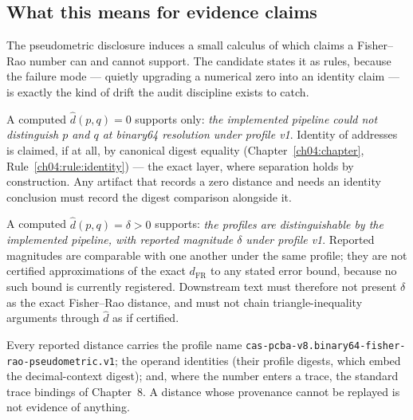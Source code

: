\subsection{What this means for evidence claims}
\label{ch06:sec:evidenceclaims}

The pseudometric disclosure induces a small calculus of which claims a
Fisher--Rao number can and cannot support. The candidate states it as
rules, because the failure mode --- quietly upgrading a numerical zero
into an identity claim --- is exactly the kind of drift the audit
discipline exists to catch.

\begin{ruleenv}
\label{ch06:rule:zero}
A computed $\widehat{d}(p, q) = 0$ supports only: \emph{the implemented
pipeline could not distinguish $p$ and $q$ at binary64 resolution under
profile v1}. Identity of addresses is claimed, if at all, by canonical
digest equality (Chapter~\ref{ch04:chapter},
Rule~\ref{ch04:rule:identity}) --- the exact layer, where separation
holds by construction. Any artifact that records a zero distance and
needs an identity conclusion must record the digest comparison
alongside it.
\end{ruleenv}

\begin{ruleenv}
\label{ch06:rule:positive}
A computed $\widehat{d}(p, q) = \delta > 0$ supports:
\emph{the profiles are distinguishable by the implemented pipeline, with
reported magnitude $\delta$ under profile v1}. Reported magnitudes are
comparable with one another under the same profile; they are not
certified approximations of the exact $d_{\mathrm{FR}}$ to any stated
error bound, because no such bound is currently registered. Downstream
text must therefore not present $\delta$ as the exact Fisher--Rao
distance, and must not chain triangle-inequality arguments through
$\widehat{d}$ as if certified.
\end{ruleenv}

\begin{ruleenv}
\label{ch06:rule:profiletravel}
Every reported distance carries the profile name
\texttt{cas-pcba-v8.binary64-fisher-rao-pseudometric.v1}; the operand
identities (their profile digests, which embed the decimal-context
digest); and, where the number enters a trace, the standard trace
bindings of Chapter~8. A distance whose provenance cannot be replayed
is not evidence of anything.
\end{ruleenv}

